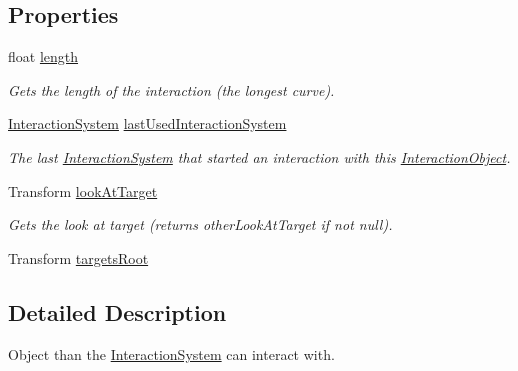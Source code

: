\subsection*{Properties}
\begin{DoxyCompactItemize}
\item 
float \mbox{\hyperlink{class_root_motion_1_1_final_i_k_1_1_interaction_object_aa565d19aa7d062cf236f5d8fd3915eca}{length}}
\begin{DoxyCompactList}\small\item\em Gets the length of the interaction (the longest curve). \end{DoxyCompactList}\item 
\mbox{\hyperlink{class_root_motion_1_1_final_i_k_1_1_interaction_system}{Interaction\+System}} \mbox{\hyperlink{class_root_motion_1_1_final_i_k_1_1_interaction_object_a2c0ba73ce6e5b272ef88b3b6a950b9a9}{last\+Used\+Interaction\+System}}
\begin{DoxyCompactList}\small\item\em The last \mbox{\hyperlink{class_root_motion_1_1_final_i_k_1_1_interaction_system}{Interaction\+System}} that started an interaction with this \mbox{\hyperlink{class_root_motion_1_1_final_i_k_1_1_interaction_object}{Interaction\+Object}}. \end{DoxyCompactList}\item 
Transform \mbox{\hyperlink{class_root_motion_1_1_final_i_k_1_1_interaction_object_a24623f2aaaa949e16a4e48f03d8bc7d8}{look\+At\+Target}}
\begin{DoxyCompactList}\small\item\em Gets the look at target (returns other\+Look\+At\+Target if not null). \end{DoxyCompactList}\item 
Transform \mbox{\hyperlink{class_root_motion_1_1_final_i_k_1_1_interaction_object_a73da4365ee244b4780c68bdc1a1ec2dd}{targets\+Root}}
\end{DoxyCompactItemize}


\subsection{Detailed Description}
Object than the \mbox{\hyperlink{class_root_motion_1_1_final_i_k_1_1_interaction_system}{Interaction\+System}} can interact with. 



